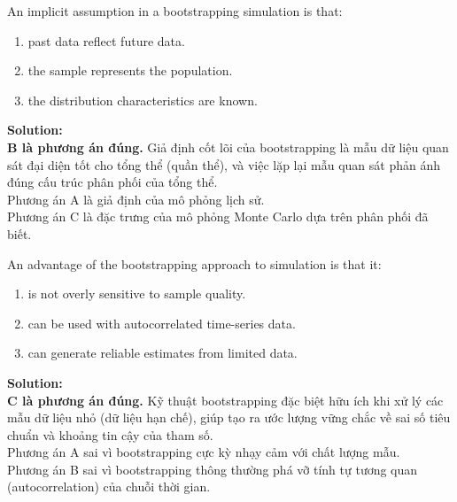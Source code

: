 \begin{tcolorbox}[
	colback=gray!5!white,
	colframe=black!15!white,
	boxrule=0.5pt,
	arc=3pt,
	title=\textbf{Question 3},
	coltitle=black,
	colbacktitle=black!5!white,
	before skip=6pt,
	after skip=6pt,
	breakable
]
An implicit assumption in a bootstrapping simulation is that:
\begin{enumerate}[label=\Alph*.]
	\item past data reflect future data.
	\item the sample represents the population.
	\item the distribution characteristics are known.
\end{enumerate}

\textbf{Solution:} \\
\textbf{B là phương án đúng.} Giả định cốt lõi của bootstrapping là mẫu dữ liệu quan sát đại diện tốt cho tổng thể (quần thể), và việc lặp lại mẫu quan sát phản ánh đúng cấu trúc phân phối của tổng thể. \\
Phương án A là giả định của mô phỏng lịch sử. \\
Phương án C là đặc trưng của mô phỏng Monte Carlo dựa trên phân phối đã biết.
\end{tcolorbox}

\begin{tcolorbox}[
	colback=gray!5!white,
	colframe=black!15!white,
	boxrule=0.5pt,
	arc=3pt,
	title=\textbf{Question 4},
	coltitle=black,
	colbacktitle=black!5!white,
	before skip=6pt,
	after skip=6pt,
	breakable
]
An advantage of the bootstrapping approach to simulation is that it:
\begin{enumerate}[label=\Alph*.]
	\item is not overly sensitive to sample quality.
	\item can be used with autocorrelated time-series data.
	\item can generate reliable estimates from limited data.
\end{enumerate}

\textbf{Solution:} \\
\textbf{C là phương án đúng.} Kỹ thuật bootstrapping đặc biệt hữu ích khi xử lý các mẫu dữ liệu nhỏ (dữ liệu hạn chế), giúp tạo ra ước lượng vững chắc về sai số tiêu chuẩn và khoảng tin cậy của tham số. \\
Phương án A sai vì bootstrapping cực kỳ nhạy cảm với chất lượng mẫu. \\
Phương án B sai vì bootstrapping thông thường phá vỡ tính tự tương quan (autocorrelation) của chuỗi thời gian.
\end{tcolorbox}


